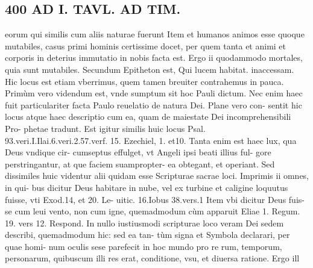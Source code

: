 \documentclass{article}
\begin{document}
\begin{pages}
\section*{400 AD I. TAVL. AD TIM. }\pstart eorum qui similis cum aliis naturae fuerunt Item et humanos animos esse quoque mutabiles, casus primi hominis certissime docet, per quem tanta et animi et corporis in deterius immutatio in nobis facta est. Ergo ii quodammodo mortales, quia sunt mutabiles.  \pend\pstart Secundum Epitheton est, Qui lucem habitat. inaccessam. Hic locus est etiam vberrimus, quem tamen breuiter contrahemus in pauca. Primùm vero videndum est, vnde sumptum sit hoc Pauli dictum. Nec enim haec fuit particulariter facta Paulo reuelatio de natura Dei. Plane vero con- sentit hic locus atque haec descriptio cum ea, quam de maiestate Dei incomprehensibili Pro- phetae tradunt. Est igitur similis huic locus Psal. 93.veri.I.Ilai.6.veri.2.57.verf. 15. Ezechiel, 1. et10. Tanta enim est haec lux, qua Deus vndique cir- cumseptus effulget, vt Angeli ipsi beati illius ful- gore perstringantur, at que faciem suampropter- ea obtegant, et operiant.  \pend\pstart Sed dissimiles huic videntur alii quidam esse Scripturae sacrae loci. Imprimis ii omnes, in qui- bus dicitur Deus habitare in nube, vel ex turbine et caligine loquutus fuisse, vti Exod.14, et 20. Le- uitic. 16.Iobus 38.vers.1 Item vbi dicitur Deus fuis- se cum leui vento, non cum igne, quemadmodum cùm apparuit Eliae 1. Regum. 19. vers 12. Respond. In nullo iustiusmodi scripturae loco veram Dei sedem describi, quemadmodum hic: sed ea tan- tùm signa et Symbola declarari, per quae homi- num oculis sese parefecit in hoc mundo pro re rum, temporum, personarum, quibuscum illi res erat, conditione, vsu, et diuersa ratione. Ergo ill  \pend

\end{pages}
\end{document}
